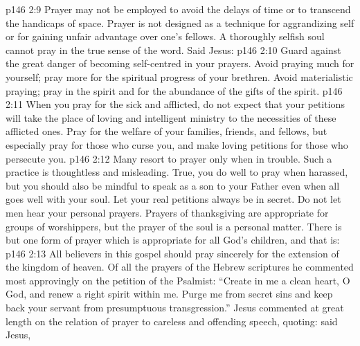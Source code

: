 \vs p146 2:9 \bibnobreakspace Prayer may not be employed to avoid the delays of time or to transcend the handicaps of space. Prayer is not designed as a technique for aggrandizing self or for gaining unfair advantage over one’s fellows. A thoroughly selfish soul cannot pray in the true sense of the word. Said Jesus: 
\vs p146 2:10 \bibnobreakspace {} Guard against the great danger of becoming self\hyp{}centred in your prayers. Avoid praying much for yourself; pray more for the spiritual progress of your brethren. Avoid materialistic praying; pray in the spirit and for the abundance of the gifts of the spirit.
\vs p146 2:11 \bibnobreakspace When you pray for the sick and afflicted, do not expect that your petitions will take the place of loving and intelligent ministry to the necessities of these afflicted ones. Pray for the welfare of your families, friends, and fellows, but especially pray for those who curse you, and make loving petitions for those who persecute you. 
\vs p146 2:12 \bibnobreakspace Many resort to prayer only when in trouble. Such a practice is thoughtless and misleading. True, you do well to pray when harassed, but you should also be mindful to speak as a son to your Father even when all goes well with your soul. Let your real petitions always be in secret. Do not let men hear your personal prayers. Prayers of thanksgiving are appropriate for groups of worshippers, but the prayer of the soul is a personal matter. There is but one form of prayer which is appropriate for all God’s children, and that is: 
\vs p146 2:13 \bibnobreakspace All believers in this gospel should pray sincerely for the extension of the kingdom of heaven. Of all the prayers of the Hebrew scriptures he commented most approvingly on the petition of the Psalmist: “Create in me a clean heart, O God, and renew a right spirit within me. Purge me from secret sins and keep back your servant from presumptuous transgression.” Jesus commented at great length on the relation of prayer to careless and offending speech, quoting:  said Jesus, 
